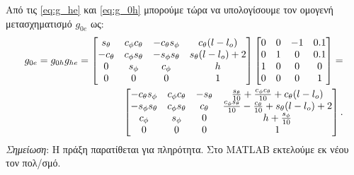 \documentclass[12pt]{article} %
\numberwithin{equation}{section}  %
\begin{document}
Από τις \eqref{eq:g_he} και \eqref{eq:g_0h} μπορούμε τώρα να υπολογίσουμε τον ομογενή μετασχηματισμό $g_{0e}$ ως:
\begin{align} \label{eq:g_0e}
    g_{0e} = g_{0h} g_{he} = 
    \begin{bmatrix} 
        s_{\theta}  &  c_{\phi} c_{\theta}  & -c_{\theta} s_{\phi}   &  c_{\theta} (l - l_o)  \\
        -c_{\theta} &  c_{\phi} s_{\theta}  & -s_{\phi} s_{\theta}   &  s_{\theta} (l - l_o) + 2  \\
        0           &  s_{\phi}             &  c_{\phi}              &  h  \\
        0           &  0                    &  0                     &  1  
    \end{bmatrix} \begin{bmatrix} 
        0   &  0  & -1  &  0.1  \\
        0   &  1  &  0  &  0.1  \\
        1   &  0  &  0  &  0  \\
        0   &  0  &  0  &  1  
    \end{bmatrix} = \\
    \begin{bmatrix} 
        -c_{\theta} s_{\phi} & c_{\phi} c_{\theta} & -s_{\theta} & \frac{s_{\theta}}{10} + \frac{c_{\phi} c_{\theta}}{10} + c_{\theta}(l - l_o) \\
        -s_{\phi} s_{\theta} & c_{\phi} s_{\theta} & c_{\theta} & \frac{c_{\phi} s_{\theta}}{10} - \frac{c_{\theta}}{10} + s_{\theta}(l - l_o) + 2 \\
        c_{\phi} & s_{\phi} & 0 & h + \frac{s_{\phi}}{10} \\
        0 & 0 & 0 & 1
    \end{bmatrix}. \notag    
\end{align}
\textit{Σημείωση}: Η πράξη παρατίθεται για πληρότητα. Στο MATLAB εκτελούμε εκ νέου τον πολ/σμό.
\end{document}
